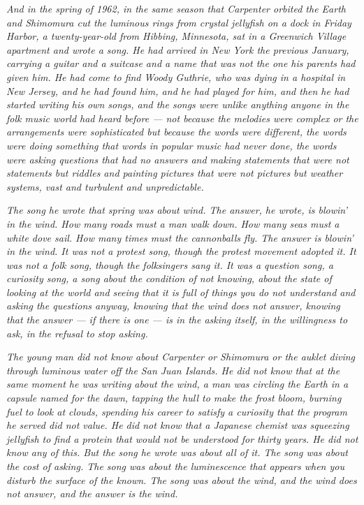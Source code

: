 \documentclass[12pt, letterpaper]{article}
\begin{document}
\emph{And in the spring of 1962, in the same season that Carpenter orbited the Earth and Shimomura cut the luminous rings from crystal jellyfish on a dock in Friday Harbor, a twenty-year-old from Hibbing, Minnesota, sat in a Greenwich Village apartment and wrote a song. He had arrived in New York the previous January, carrying a guitar and a suitcase and a name that was not the one his parents had given him. He had come to find Woody Guthrie, who was dying in a hospital in New Jersey, and he had found him, and he had played for him, and then he had started writing his own songs, and the songs were unlike anything anyone in the folk music world had heard before --- not because the melodies were complex or the arrangements were sophisticated but because the words were different, the words were doing something that words in popular music had never done, the words were asking questions that had no answers and making statements that were not statements but riddles and painting pictures that were not pictures but weather systems, vast and turbulent and unpredictable.}

\emph{The song he wrote that spring was about wind. The answer, he wrote, is blowin' in the wind. How many roads must a man walk down. How many seas must a white dove sail. How many times must the cannonballs fly. The answer is blowin' in the wind. It was not a protest song, though the protest movement adopted it. It was not a folk song, though the folksingers sang it. It was a question song, a curiosity song, a song about the condition of not knowing, about the state of looking at the world and seeing that it is full of things you do not understand and asking the questions anyway, knowing that the wind does not answer, knowing that the answer --- if there is one --- is in the asking itself, in the willingness to ask, in the refusal to stop asking.}

\emph{The young man did not know about Carpenter or Shimomura or the auklet diving through luminous water off the San Juan Islands. He did not know that at the same moment he was writing about the wind, a man was circling the Earth in a capsule named for the dawn, tapping the hull to make the frost bloom, burning fuel to look at clouds, spending his career to satisfy a curiosity that the program he served did not value. He did not know that a Japanese chemist was squeezing jellyfish to find a protein that would not be understood for thirty years. He did not know any of this. But the song he wrote was about all of it. The song was about the cost of asking. The song was about the luminescence that appears when you disturb the surface of the known. The song was about the wind, and the wind does not answer, and the answer is the wind.}
\end{document}
